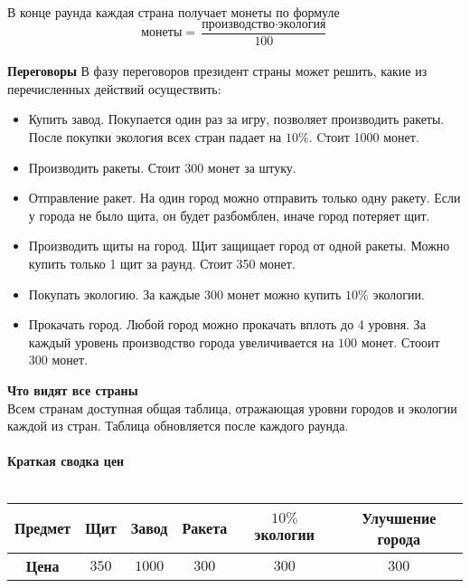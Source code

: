 \documentclass{article}
\begin{document}
В конце раунда каждая страна получает монеты по формуле $$\text{монеты} = \frac{\text{производство} \cdot \text{экология}}{100}$$%
\\
\textbf{Переговоры}
В фазу переговоров президент страны может решить, какие из перечисленных действий осуществить:
\begin{itemize}
\item Купить завод. Покупается один раз за игру, позволяет производить ракеты. После покупки экология всех стран падает на $10\%$. Cтоит 1000 монет.
\item Производить ракеты.  Стоит 300 монет за штуку. 
\item Отправление ракет. На один город можно отправить только одну ракету. Если у города не было щита, он будет разбомблен, иначе город потеряет щит.
\item Производить щиты на город. Щит защищает город от одной ракеты. Можно купить только 1 щит за раунд. Стоит 350 монет.
\item Покупать экологию. За каждые 300 монет можно купить $10\%$ экологии.
\item Прокачать город. Любой город можно прокачать вплоть до 4 уровня. За каждый уровень производство города увеличивается на $100$ монет. Стооит 300 монет.
\end{itemize}
\textbf{Что видят все страны}\\
Всем странам доступная общая таблица, отражающая уровни городов и экологии каждой из стран. Таблица обновляется после каждого раунда. %
\\
\\
\textbf{Краткая сводка цен}\\
\\
\begin{tabular}{|c|c|c|c|c|c|}
	\hline
	\textbf{Предмет} & Щит & Завод & Ракета & $10\%$ экологии & Улучшение города \\
	\hline
	\textbf{Цена} & $350$ & $1000$ & $300$ & $300$ & $300$\\
	\hline
	
\end{tabular}
\end{document}
